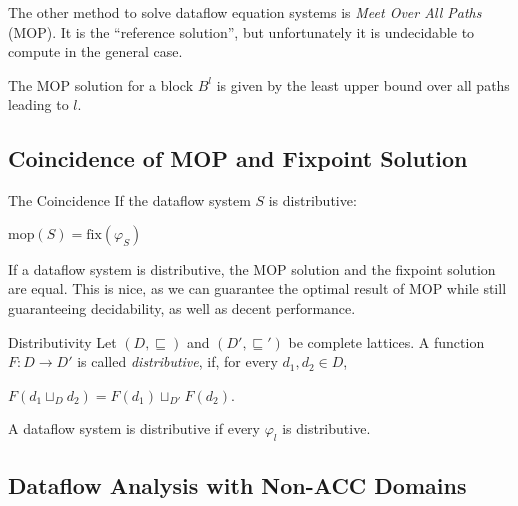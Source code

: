 \documentclass[english]{panikzettel}
\newcommand{\fix}{\mathrm{fix}}
\newcommand{\mop}{\mathrm{mop}}
\begin{document}
The other method to solve dataflow equation systems is \emph{Meet Over All Paths} (MOP).
It is the ``reference solution'', but unfortunately it is undecidable to compute in the general case.

The MOP solution for a block $B^l$ is given by the least upper bound over all paths leading to $l$.

\subsection{Coincidence of MOP and Fixpoint Solution}

\begin{halfboxl}
    \vspace{-\baselineskip}
    \begin{theo}{The Coincidence}
        If the dataflow system $S$ is distributive:

        \begin{tightcenter}
            $\mop(S) = \fix(\varphi_S)$
        \end{tightcenter}
    \end{theo}

    If a dataflow system is distributive, the MOP solution and the fixpoint solution are equal.
    This is nice, as we can guarantee the optimal result of MOP while still guaranteeing decidability, as well as decent performance.
\end{halfboxl}%
\begin{halfboxr}
    \vspace{-\baselineskip}
    \begin{defi}{Distributivity}
        Let $(D, \sqsubseteq)$ and $(D', \sqsubseteq')$ be complete lattices. A function $F : D \to D'$ is called \emph{distributive}, if, for every $d_1, d_2 \in D$,
        \medskip

        \begin{tightcenter}
            $F(d_1 \sqcup_D d_2) = F(d_1) \sqcup_{D'} F(d_2)$.
        \end{tightcenter}
        \medskip

        A dataflow system is distributive if every $\varphi_l$ is distributive.
    \end{defi}
\end{halfboxr}

\subsection{Dataflow Analysis with Non-ACC Domains}
\end{document}
